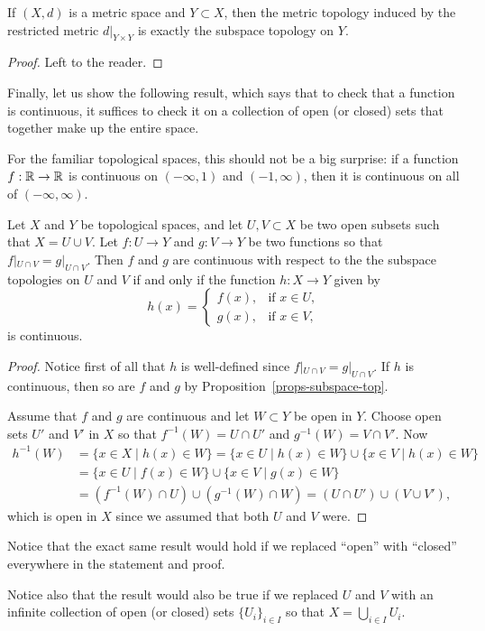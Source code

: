 \begin{prop}
  If $(X,d)$ is a metric space and $Y \subset X$, then the metric topology induced by the restricted metric $d|_{Y \times Y}$ is exactly the subspace topology on $Y$.
\end{prop}
\begin{proof}
  Left to the reader.
\end{proof}
Finally, let us show the following result, which says that to check that a function is continuous, it suffices to check it on a collection of open (or closed) sets that together make up the entire space.
\begin{example}
  For the familiar topological spaces, this should not be a big surprise: if a function $f : \mathbb{R} \to \mathbb{R}$ is continuous on $(-\infty,1)$ and $(-1,\infty)$, then it is continuous on all of $(-\infty,\infty)$.
\end{example}

\begin{lem}
  Let $X$ and $Y$ be topological spaces, and let $U,V \subset X$ be two open subsets such that $X = U \cup V$. Let $f : U \to Y$ and $g : V \to Y$ be two functions so that $f|_{U \cap V} = g|_{U \cap V}$. Then $f$ and $g$ are continuous with respect to the the subspace topologies on $U$ and $V$ if and only if the function $h : X \to Y$ given by
  \[
    h(x) = \begin{cases} f(x), & \text{if $x \in U$}, \\ g(x), & \text{if $x \in V$,} \end{cases}
  \]
  is continuous.
\end{lem}
\begin{proof}
  Notice first of all that $h$ is well-defined since $f|_{U \cap V} = g|_{U \cap V}$. If $h$ is continuous, then so are $f$ and $g$ by Proposition~\ref{props-subspace-top}.
  
  Assume that $f$ and $g$ are continuous and let $W \subset Y$ be open in $Y$. Choose open sets $U'$ and $V'$ in $X$ so that $f^{-1}(W) = U \cap U'$ and $g^{-1}(W) = V \cap V'$. Now
  \begin{align*}
    h^{-1}(W) &= \{ x \in X \mid h(x) \in W \} = \{x \in U \mid h(x) \in W \} \cup \{x \in V \mid h(x) \in W \} \\
              &= \{ x \in U \mid f(x) \in W \} \cup \{ x \in V \mid g(x) \in W \} \\
              &= (f^{-1}(W) \cap U) \cup (g^{-1}(W) \cap W) = (U \cap U') \cup (V \cup V'),
  \end{align*}
  which is open in $X$ since we assumed that both $U$ and $V$ were.
\end{proof}
\begin{rem}
  \label{pasting-closed}
  Notice that the exact same result would hold if we replaced ``open'' with ``closed'' everywhere in the statement and proof.
  
  Notice also that the result would also be true if we replaced $U$ and $V$ with an infinite collection of open (or closed) sets $\{U_i\}_{i \in I}$ so that $X = \bigcup_{i \in I} U_i$.
\end{rem}


